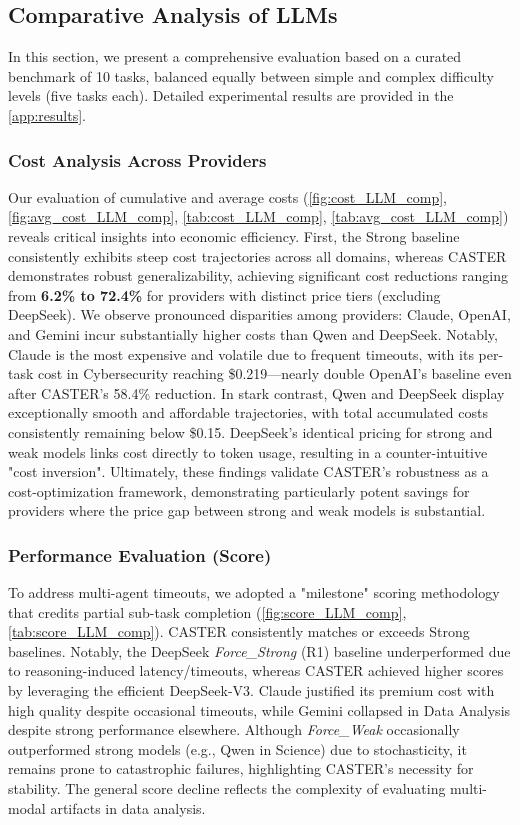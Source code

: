 \documentclass{article}
\theoremstyle{plain}
\theoremstyle{definition}
\theoremstyle{remark}
\begin{document}
\subsection{Comparative Analysis of LLMs}

In this section, we present a comprehensive evaluation based on a curated benchmark of 10 tasks, balanced equally between simple and complex difficulty levels (five tasks each). Detailed experimental results are provided in the \cref{app:results}.

\subsubsection{Cost Analysis Across Providers} 
Our evaluation of cumulative and average costs (\cref{fig:cost_LLM_comp}, \cref{fig:avg_cost_LLM_comp}, \cref{tab:cost_LLM_comp}, \cref{tab:avg_cost_LLM_comp}) reveals critical insights into economic efficiency. First, the Strong baseline consistently exhibits steep cost trajectories across all domains, whereas CASTER demonstrates robust generalizability, achieving significant cost reductions ranging from \textbf{6.2\% to 72.4\%} for providers with distinct price tiers (excluding DeepSeek). We observe pronounced disparities among providers: Claude, OpenAI, and Gemini incur substantially higher costs than Qwen and DeepSeek. Notably, Claude is the most expensive and volatile due to frequent timeouts, with its per-task cost in Cybersecurity reaching \$0.219—nearly double OpenAI’s baseline even after CASTER’s 58.4\% reduction. In stark contrast, Qwen and DeepSeek display exceptionally smooth and affordable trajectories, with total accumulated costs consistently remaining below \$0.15. DeepSeek's identical pricing for strong and weak models links cost directly to token usage, resulting in a counter-intuitive "cost inversion". Ultimately, these findings validate CASTER's robustness as a cost-optimization framework, demonstrating particularly potent savings for providers where the price gap between strong and weak models is substantial.

\subsubsection{Performance Evaluation (Score)}

To address multi-agent timeouts, we adopted a "milestone" scoring methodology\cite{zhu2025multiagentbench} that credits partial sub-task completion (\cref{fig:score_LLM_comp}, \cref{tab:score_LLM_comp}). CASTER consistently matches or exceeds Strong baselines. Notably, the DeepSeek \textit{Force\_Strong} (R1) baseline underperformed due to reasoning-induced latency/timeouts, whereas CASTER achieved higher scores by leveraging the efficient DeepSeek-V3. Claude justified its premium cost with high quality despite occasional timeouts, while Gemini collapsed in Data Analysis despite strong performance elsewhere. Although \textit{Force\_Weak} occasionally outperformed strong models (e.g., Qwen in Science) due to stochasticity, it remains prone to catastrophic failures, highlighting CASTER's necessity for stability. The general score decline reflects the complexity of evaluating multi-modal artifacts in data analysis.
\end{document}
